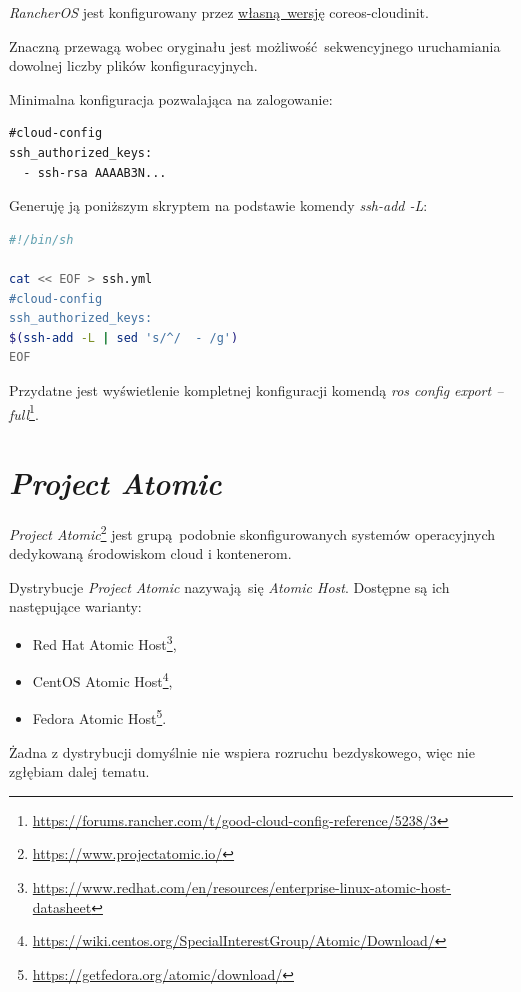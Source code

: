 \documentclass[a4paper,12pt,twoside,openany]{report}
\providecommand{\tightlist}{%
  \setlength{\itemsep}{0pt}\setlength{\parskip}{0pt}}
\DeclareRobustCommand{\href}[2]{#2\footnote{\url{#1}}}
\begin{document}
\emph{RancherOS} jest konfigurowany przez
\protect\hyperlink{rancheros-+-coreos-cloudinit}{własną~wersję}
coreos-cloudinit.

Znaczną przewagą wobec oryginału jest możliwość~sekwencyjnego
uruchamiania dowolnej liczby plików konfiguracyjnych.

Minimalna konfiguracja pozwalająca na zalogowanie:

\begin{lstlisting}
#cloud-config
ssh_authorized_keys:
  - ssh-rsa AAAAB3N...
\end{lstlisting}

Generuję ją poniższym skryptem na podstawie komendy \emph{ssh-add -L}:

\begin{lstlisting}[language=bash]
#!/bin/sh

cat << EOF > ssh.yml
#cloud-config
ssh_authorized_keys:
$(ssh-add -L | sed 's/^/  - /g')
EOF
\end{lstlisting}

Przydatne jest wyświetlenie kompletnej konfiguracji komendą
\href{https://forums.rancher.com/t/good-cloud-config-reference/5238/3}{\emph{ros
config export --full}}.

\hypertarget{project-atomic}{%
\section{\texorpdfstring{\emph{Project
Atomic}}{Project Atomic}}\label{project-atomic}}

\href{https://www.projectatomic.io/}{\emph{Project Atomic}} jest
grupą~podobnie skonfigurowanych systemów operacyjnych dedykowaną
środowiskom cloud i kontenerom.

Dystrybucje \emph{Project Atomic} nazywają~się \emph{Atomic Host}.
Dostępne są ich następujące warianty:

\begin{itemize}
\tightlist
\item
  \href{https://www.redhat.com/en/resources/enterprise-linux-atomic-host-datasheet}{Red
  Hat Atomic Host},
\item
  \href{https://wiki.centos.org/SpecialInterestGroup/Atomic/Download/}{CentOS
  Atomic Host},
\item
  \href{https://getfedora.org/atomic/download/}{Fedora Atomic Host}.
\end{itemize}

Żadna z dystrybucji domyślnie nie wspiera rozruchu bezdyskowego, więc
nie zgłębiam dalej tematu.
\end{document}
